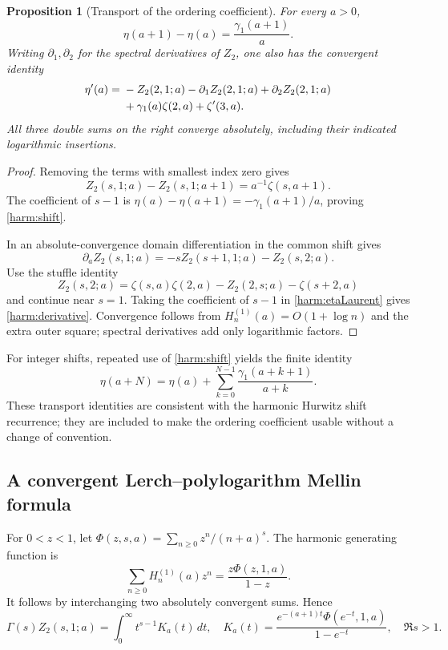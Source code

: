 \documentclass[11pt,letterpaper]{article}
\numberwithin{equation}{section}
\newtheorem{proposition}[theorem]{Proposition}
\theoremstyle{definition}
\theoremstyle{remark}
\begin{document}
\begin{proposition}[Transport of the ordering coefficient]
\label{harm:transport}
For every $a>0$,
\begin{equation}\label{harm:shift}
 \boxed{\eta(a+1)-\eta(a)=\frac{\gamma_1(a+1)}a.}
\end{equation}
Writing $\partial_1,\partial_2$ for the spectral derivatives of
$Z_2$, one also has the convergent identity
\begin{align}\label{harm:derivative}
 \eta'(a)={}&-Z_2(2,1;a)-\partial_1Z_2(2,1;a)
                 +\partial_2Z_2(2,1;a)\notag\\
 &+\gamma_1(a)\zeta(2,a)+\zeta'(3,a).
\end{align}
All three double sums on the right converge absolutely, including
their indicated logarithmic insertions.
\end{proposition}

\begin{proof}
Removing the terms with smallest index zero gives
\[
 Z_2(s,1;a)-Z_2(s,1;a+1)=a^{-1}\zeta(s,a+1).
\]
The coefficient of $s-1$ is
$\eta(a)-\eta(a+1)=-\gamma_1(a+1)/a$, proving
\eqref{harm:shift}.

In an absolute-convergence domain differentiation in the common
shift gives
\[
 \partial_a Z_2(s,1;a)=-sZ_2(s+1,1;a)-Z_2(s,2;a).
\]
Use the stuffle identity
\[
 Z_2(s,2;a)=\zeta(s,a)\zeta(2,a)-Z_2(2,s;a)-\zeta(s+2,a)
\]
and continue near $s=1$. Taking the coefficient of $s-1$ in
\eqref{harm:etaLaurent} gives \eqref{harm:derivative}.
Convergence follows from $H_n^{(1)}(a)=O(1+\log n)$ and the extra
outer square; spectral derivatives add only logarithmic factors.
\end{proof}

For integer shifts, repeated use of \eqref{harm:shift} yields the
finite identity
\[
 \eta(a+N)=\eta(a)+\sum_{k=0}^{N-1}
                         \frac{\gamma_1(a+k+1)}{a+k}.
\]
These transport identities are consistent with the harmonic Hurwitz
shift recurrence; they are included to make the ordering coefficient
usable without a change of convention.

\subsection{A convergent Lerch--polylogarithm Mellin formula}

For $0<z<1$, let $\Phi(z,s,a)=\sum_{n\ge0}z^n/(n+a)^s$.
The harmonic generating function is
\begin{equation}\label{harm:gen}
 \sum_{n\ge0}H_n^{(1)}(a)z^n=\frac{z\Phi(z,1,a)}{1-z}.
\end{equation}
It follows by interchanging two absolutely convergent sums. Hence
\begin{equation}\label{harm:Mellin}
 \Gamma(s)Z_2(s,1;a)=\int_0^\infty t^{s-1}K_a(t)\,dt,
 \quad K_a(t)=\frac{e^{-(a+1)t}\Phi(e^{-t},1,a)}{1-e^{-t}},
 \quad \Re s>1.
\end{equation}
\end{document}
